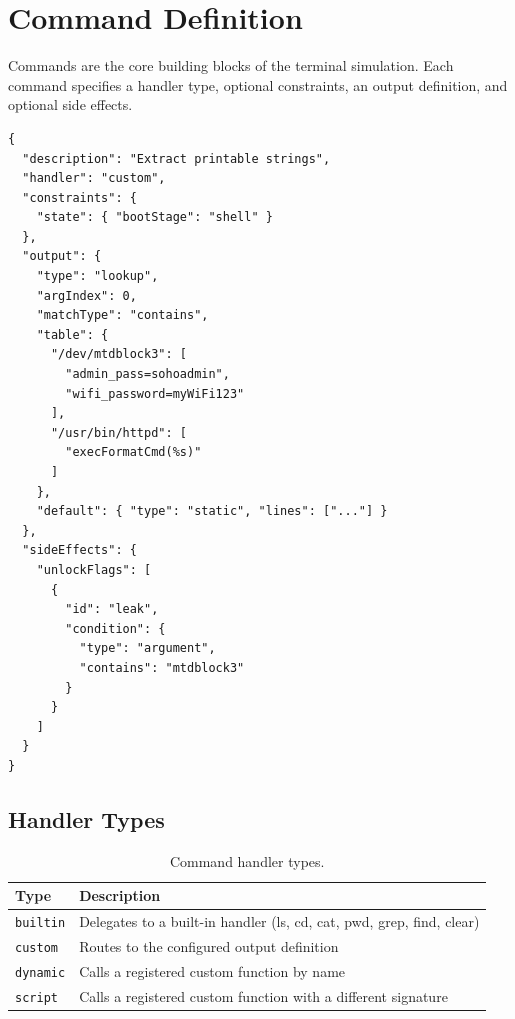 \section{Command Definition}\label{sec:app-tc-cmd}

Commands are the core building blocks of the terminal simulation. Each command specifies a handler type, optional constraints, an output definition, and optional side effects.

\noindent\begin{minipage}{\linewidth}
\begin{lstlisting}[language={}, caption={CommandDefinition with lookup output.}]
{
  "description": "Extract printable strings",
  "handler": "custom",
  "constraints": {
    "state": { "bootStage": "shell" }
  },
  "output": {
    "type": "lookup",
    "argIndex": 0,
    "matchType": "contains",
    "table": {
      "/dev/mtdblock3": [
        "admin_pass=sohoadmin",
        "wifi_password=myWiFi123"
      ],
      "/usr/bin/httpd": [
        "execFormatCmd(%s)"
      ]
    },
    "default": { "type": "static", "lines": ["..."] }
  },
  "sideEffects": {
    "unlockFlags": [
      {
        "id": "leak",
        "condition": {
          "type": "argument",
          "contains": "mtdblock3"
        }
      }
    ]
  }
}
\end{lstlisting}
\end{minipage}

\subsection{Handler Types}\label{subsec:app-handlers}

\begin{table}[H]
\centering
\caption{Command handler types.}
\label{tab:handlers}
\begin{tabularx}{\textwidth}{lX}
\toprule
\textbf{Type} & \textbf{Description} \\
\midrule
\texttt{builtin}  & Delegates to a built-in handler (ls, cd, cat, pwd, grep, find, clear) \\
\texttt{custom}   & Routes to the configured output definition \\
\texttt{dynamic}  & Calls a registered custom function by name \\
\texttt{script}   & Calls a registered custom function with a different signature \\
\bottomrule
\end{tabularx}
\end{table}

